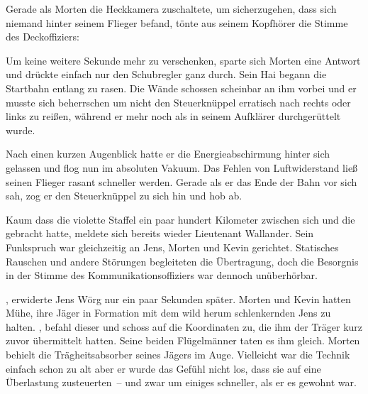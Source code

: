 \par

Gerade als Morten die Heckkamera zuschaltete, um sicherzugehen, dass sich niemand hinter seinem Flieger befand, tönte aus seinem Kopfhörer die Stimme des Deckoffiziers: 

\par

Um keine weitere Sekunde mehr zu verschenken, sparte sich Morten eine Antwort und drückte einfach nur den Schubregler ganz durch. Sein Hai begann die Startbahn entlang zu rasen. Die Wände schossen scheinbar an ihm vorbei und er musste sich beherrschen um nicht den Steuerknüppel erratisch nach rechts oder links zu reißen, während er mehr noch als in seinem Aufklärer durchgerüttelt wurde.

\par

Nach einen kurzen Augenblick hatte er die Energieabschirmung hinter sich gelassen und flog nun im absoluten Vakuum. Das Fehlen von Luftwiderstand ließ seinen Flieger rasant schneller werden. Gerade als er das Ende der Bahn vor sich sah, zog er den Steuerknüppel zu sich hin und hob ab.

\par

Kaum dass die violette Staffel ein paar hundert Kilometer zwischen sich und die  gebracht hatte, meldete sich bereits wieder Lieutenant Wallander. Sein Funkspruch war gleichzeitig an Jens, Morten und Kevin gerichtet. Statisches Rauschen und andere Störungen begleiteten die Übertragung, doch die Besorgnis in der Stimme des Kommunikationsoffiziers war dennoch unüberhörbar.

\par


\par

, erwiderte Jens Wörg nur ein paar Sekunden später.  Morten und Kevin hatten Mühe, ihre Jäger in Formation mit dem wild herum schlenkernden Jens zu halten. , befahl dieser und schoss auf die Koordinaten zu, die ihm der Träger kurz zuvor übermittelt hatten. Seine beiden Flügelmänner taten es ihm gleich. Morten behielt die Trägheitsabsorber seines Jägers im Auge. Vielleicht war die Technik einfach schon zu alt aber er wurde das Gefühl nicht los, dass sie auf eine Überlastung zusteuerten~-- und zwar um einiges schneller, als er es gewohnt war.

